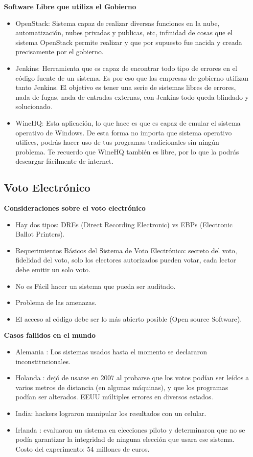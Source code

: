 {\bf Software Libre que utiliza el Gobierno}
\begin{itemize}
\item  OpenStack: Sistema capaz de realizar diversas funciones en la nube, automatización, nubes privadas y publicas, etc, infinidad de cosas que el sistema OpenStack permite realizar y que por supuesto fue nacida y creada precisamente por el gobierno.
\item Jenkins: Herramienta que es capaz de encontrar todo tipo de errores en el código fuente de un sistema. Es por eso que las empresas de gobierno utilizan tanto Jenkins. El objetivo es tener una serie de sistemas libres de errores, nada de fugas, nada de entradas externas, con Jenkins todo queda blindado y solucionado. 
\item WineHQ: Esta aplicación, lo que hace es que es capaz de emular el sistema operativo de Windows. De esta forma no importa que sistema operativo utilices, podrás hacer uso de tus programas tradicionales sin ningún problema. Te recuerdo que WineHQ también es libre, por lo que la podrás descargar fácilmente de internet.
\end{itemize}

\subsection{Voto Electrónico}

{\bf Consideraciones sobre el voto electrónico}
\begin{itemize}
\item Hay dos tipos: DREs (Direct Recording Electronic)  vs  EBPs (Electronic Ballot Printers).
\item Requerimientos Básicos del Sistema de Voto Electrónico: secreto del voto, fidelidad del voto, solo los electores autorizados pueden votar, cada lector debe emitir un solo voto.
\item No es Fácil hacer un sistema que pueda ser auditado.
\item Problema de las amenazas.
\item El acceso al código debe ser lo más abierto posible (Open source Software).
\end{itemize}

{\bf Casos fallidos en el mundo}

\begin{itemize}
\item Alemania : Los sistemas usados hasta el momento se declararon inconstitucionales.
\item Holanda : dejó de usarse en 2007 al probarse que los votos podían ser leídos a varios metros de distancia (en algunas máquinas), y que los programas podían ser alterados. EEUU múltiples errores en diversos estados.
\item India:  hackers lograron manipular los resultados con un celular. 
\item Irlanda : evaluaron un sistema en elecciones piloto y determinaron que no se podía garantizar la integridad de ninguna elección que usara ese sistema. Costo del experimento: 54 millones de euros.
\end{itemize}

